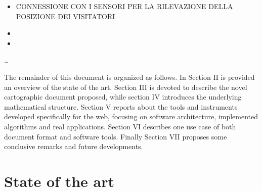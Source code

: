 \documentclass{sig-alternate}
\begin{document}
\begin{itemize}
\item
  CONNESSIONE CON I SENSORI PER LA RILEVAZIONE DELLA POSIZIONE DEI
  VISITATORI
\item
\item
\end{itemize}

\ldots{}

The remainder of this document is organized as follows. In Section II is
provided an overview of the state of the art. Section III is devoted to
describe the novel cartographic document proposed, while section IV introduces
the underlying mathematical structure. Section V reports about the tools and
instruments developed specifically for the web, focusing on software
architecture, implemented algorithms and real applications. Section VI
describes one use case of both document format and software tools. Finally
Section VII proposes some conclusive remarks and future developments.

\section{State of the art}\label{state-of-the-art}
\end{document}
